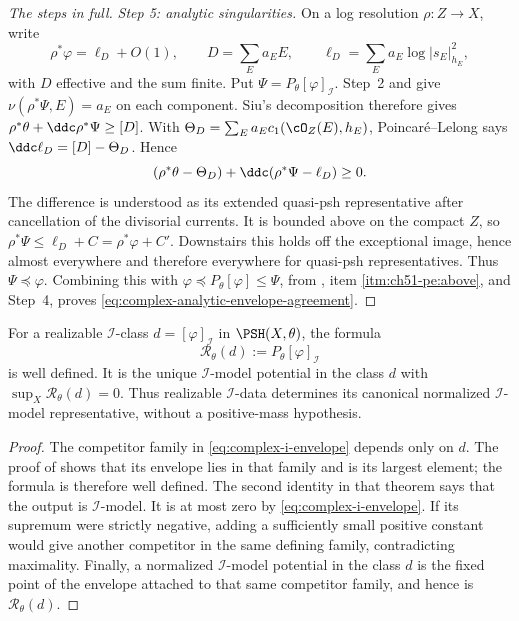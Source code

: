 \begin{proof}[The steps in full]
\emph{Step 5: analytic singularities.}  On a log resolution
$\rho:Z\to X$, write
\[
 \rho^*\varphi=\ell_D+O(1),\qquad
 D=\sum_Ea_EE,\qquad \ell_D=\sum_Ea_E\log|s_E|_{h_E}^2,
\]
with $D$ effective and the sum finite.  Put
$\Psi=P_\theta[\varphi]_{\mathcal I}$.  Step~2 and
 give
$\nu(\rho^*\Psi,E)=a_E$ on each component.  Siu's decomposition
therefore gives
$\rho^*\theta+\ddc\rho^*\Psi\geq[D]$.
With $\Theta_D=\sum_Ea_Ec_1(\cO_Z(E),h_E)$,
Poincar\'e--Lelong says $\ddc\ell_D=[D]-\Theta_D$.  Hence
\[
 (\rho^*\theta-\Theta_D)+\ddc(\rho^*\Psi-\ell_D)\geq0.
\]
The difference is understood as its extended quasi-psh representative
after cancellation of the divisorial currents.  It is bounded above
on the compact $Z$, so $\rho^*\Psi\leq\ell_D+C=\rho^*\varphi+C'$.
Downstairs this holds off the exceptional image, hence almost everywhere
and therefore everywhere for quasi-psh representatives.  Thus
$\Psi\preceq\varphi$.  Combining this with
$\varphi\preceq P_\theta[\varphi]\leq\Psi$, from
, item \cref{itm:ch51-pe:above}, and
Step~4, proves \eqref{eq:complex-analytic-envelope-agreement}.
\end{proof}

\par\noindent\begin{minipage}{\textwidth}
\begin{corollary}
\label{cor:ch51-i-canonical-reconstruction}
For a realizable $\mathcal I$-class
$d=[\varphi]_{\mathcal I}$ in $\PSH(X,\theta)$, the formula
\[
 \mathcal R_\theta(d):=P_\theta[\varphi]_{\mathcal I}
\]
is well defined.  It is the unique $\mathcal I$-model potential in the
class $d$ with $\sup_X\mathcal R_\theta(d)=0$.  Thus realizable
$\mathcal I$-data determines its canonical normalized
$\mathcal I$-model representative, without a positive-mass hypothesis.
\end{corollary}
\end{minipage}\par\medskip

\begin{proof}
The competitor family in \eqref{eq:complex-i-envelope} depends only on
$d$.  The proof of  shows that its
envelope lies in that family and is its largest element; the formula is
therefore well defined.  The second identity in that theorem says that the
output is $\mathcal I$-model.  It is at most zero by
\eqref{eq:complex-i-envelope}.  If its supremum were strictly negative,
adding a sufficiently small positive constant would give another competitor
in the same defining family, contradicting maximality.  Finally, a
normalized $\mathcal I$-model potential in the class $d$ is the fixed
point of the envelope attached to that same competitor family, and hence is
$\mathcal R_\theta(d)$.
\end{proof}

